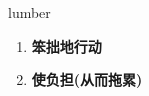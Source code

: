 
\begin{frame}
{\huge lumber}
\begin{center}
\begin{enumerate}\Large
  \item \textbf{笨拙地行动}
  \item \textbf{使负担(从而拖累)}
\end{enumerate}
\end{center}
\end{frame}
